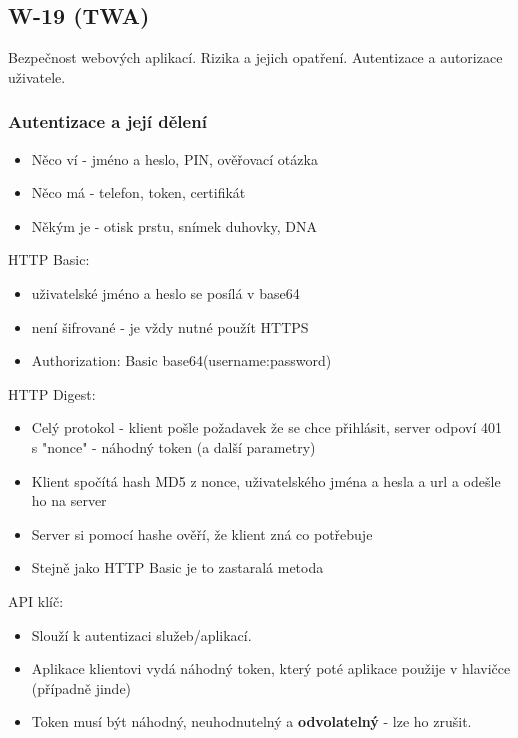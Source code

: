 \subsection{W-19 (TWA)}
Bezpečnost webových aplikací. Rizika a jejich opatření. Autentizace a autorizace uživatele.

\subsubsection*{Autentizace a její dělení}

\begin{itemize}
  \item Něco ví - jméno a heslo, PIN, ověřovací otázka
  \item Něco má - telefon, token, certifikát
  \item Někým je - otisk prstu, snímek duhovky, DNA
\end{itemize}

HTTP Basic:
\begin{itemize}
  \item uživatelské jméno a heslo se posílá v base64 
  \item není šifrované - je vždy nutné použít HTTPS
  \item Authorization: Basic base64(username:password)
\end{itemize}

HTTP Digest: 
\begin{itemize}
  \item Celý protokol - klient pošle požadavek že se chce přihlásit, server odpoví 401 s "nonce" - náhodný token (a další parametry)
  \item Klient spočítá hash MD5 z nonce, uživatelského jména a hesla a url a odešle ho na server
  \item Server si pomocí hashe ověří, že klient zná co potřebuje
  \item Stejně jako HTTP Basic je to zastaralá metoda
\end{itemize}


API klíč:
\begin{itemize}
  \item Slouží k autentizaci služeb/aplikací.
  \item Aplikace klientovi vydá náhodný token, který poté aplikace použije v hlavičce (případně jinde)
  \item Token musí být náhodný, neuhodnutelný a \textbf{odvolatelný} - lze ho zrušit.
\end{itemize}

